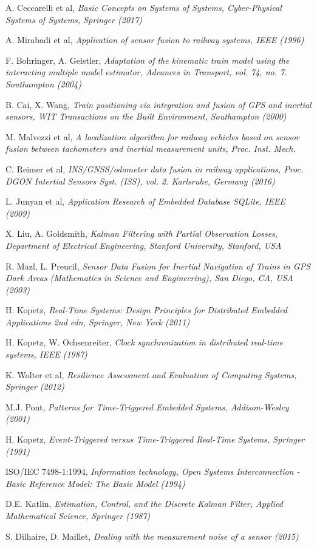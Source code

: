 \begin{thebibliography}{9}
A. Ceccarelli et al, \emph{Basic Concepts on Systems of Systems, Cyber-Physical Systems of Systems, Springer (2017)}


A. Mirabadi et al, \textit{Application of sensor fusion to railway systems, IEEE (1996)}

F. Bohringer, A. Geistler, \textit{Adaptation of the kinematic train
	model using the interacting multiple model estimator, Advances in
	Transport, vol. 74, no. 7. Southampton (2004)}

B. Cai, X. Wang, \textit{Train positioning via integration and
fusion of GPS and inertial sensors, WIT Transactions on the Built Environment, Southampton (2000)}

M. Malvezzi et al, \textit{A localization algorithm for railway vehicles based on sensor fusion between tachometers and inertial measurement units, Proc. Inst. Mech.}

C. Reimer et al, \textit{INS/GNSS/odometer
data fusion in railway applications, Proc. DGON Intertial Sensors
Syst. (ISS), vol. 2. Karlsruhe, Germany (2016)} 

L. Junyan et al, \textit{Application Research of Embedded Database SQLite, IEEE (2009)}

X. Liu, A. Goldsmith, \textit{
Kalman  Filtering with Partial Observation Losses, Department of Electrical Engineering, Stanford University, Stanford, USA}

R. Mazl, L. Preucil, \textit{Sensor Data Fusion for Inertial Navigation of
Trains in GPS Dark Areas (Mathematics in Science and Engineering),
San Diego, CA, USA (2003)}

H. Kopetz, \textit{Real-Time Systems: Design Principles for Distributed Embedded Applications 2nd edn, Springer, New York (2011)}

H. Kopetz, W. Ochsenreiter, \textit{Clock synchronization in distributed real-time systems, IEEE (1987)}

K. Wolter et al,
\textit{Resilience Assessment and Evaluation of Computing Systems, Springer (2012)}

M.J. Pont, \emph{Patterns for Time-Triggered Embedded Systems, Addison-Wesley (2001)}

H. Kopetz, \emph{Event-Triggered versus Time-Triggered Real-Time Systems, Springer (1991)}

ISO/IEC 7498-1:1994, \textit{
Information technology, Open Systems Interconnection - Basic Reference Model: The Basic Model (1994)}

D.E. Katlin, \textit{Estimation, Control, and the Discrete Kalman Filter, Applied Mathematical Science, Springer (1987)}

S. Dilhaire, D. Maillet, \textit{Dealing  with the measurement noise of a sensor (2015)}

\end{thebibliography}